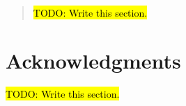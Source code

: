 
\begin{abstract}
	\hl{TODO: Write this section.}
\end{abstract}

\clearpage

\section*{Acknowledgments}
\label{sec:acknowledgments}

\hl{TODO: Write this section.}

\clearpage

\tableofcontents

\clearpage
{}
